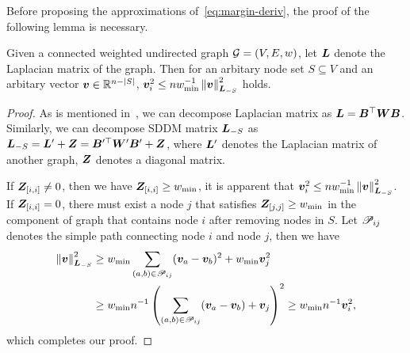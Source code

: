 \documentclass[sigconf]{acmart}
\begin{document}
Before proposing the approximations of~\eqref{eq:margin-deriv}, the proof of the following lemma is necessary.
\begin{lemma}\label{lem:norm-ineq}
    Given a connected weighted undirected graph \(\mathcal{G}=(V,E,w)\), let \(\boldsymbol{L}\) denote the Laplacian matrix of the graph.
    Then for an arbitary node set \(S\subseteq V\) and an arbitary vector \(\boldsymbol{v}\in\mathbb{R}^{n-\left|S \right|}\), \(\boldsymbol{v}_i^2\le nw_{\min}^{-1}\left\Vert\boldsymbol{v}\right\Vert^2_{\boldsymbol{L}_{-S}}\) holds.
\end{lemma}

\begin{proof}
    As is mentioned in~, we can decompose Laplacian matrix as \(\boldsymbol{L}=\boldsymbol{B}^\top\boldsymbol{W}\boldsymbol{B}\).
    Similarly, we can decompose SDDM matrix \(\boldsymbol{L}_{-S}\) as \(\boldsymbol{L}_{-S}=\boldsymbol{L}'+\boldsymbol{Z}=\boldsymbol{B}'^\top\boldsymbol{W}'\boldsymbol{B}'+\boldsymbol{Z}\), where \(\boldsymbol{L}'\) denotes the Laplacian matrix of another graph, \(\boldsymbol{Z}\) denotes a diagonal matrix.

    If \(\boldsymbol{Z}_{[i,i]}\neq0\), then we have \(\boldsymbol{Z}_{[i,i]}\ge w_{\min}\), it is apparent that \(\boldsymbol{v}_i^2\le nw_{\min}^{-1}\left\Vert\boldsymbol{v}\right\Vert^2_{\boldsymbol{L}_{-S}}\).
    If \(\boldsymbol{Z}_{[i,i]}=0\), there must exist a node \(j\) that satisfies \(\boldsymbol{Z}_{[j,j]}\ge w_{\min}\) in the component of graph that contains node \(i\) after removing nodes in \(S\).
    Let \(\mathscr{P}_{ij}\) denotes the simple path connecting node \(i\) and node \(j\), then we have
    \begin{align*}
        \left\Vert\boldsymbol{v}\right\Vert^2_{\boldsymbol{L}_{-S}}
         & \ge w_{\min}\sum_{\left( a,b \right)\in\mathscr{P}_{ij}}(\boldsymbol{v}_a-\boldsymbol{v}_b)^2+w_{\min}\boldsymbol{v}_j^2     \\
         & \ge w_{\min}n^{-1}\left( \sum_{\left( a,b \right)\in\mathscr{P}_{ij}}(\boldsymbol{v}_a-\boldsymbol{v}_b)+\boldsymbol{v}_j \right)^2
        \ge w_{\min}n^{-1}\boldsymbol{v}_i^2,
    \end{align*}
    which completes our proof.
\end{proof}
\end{document}
